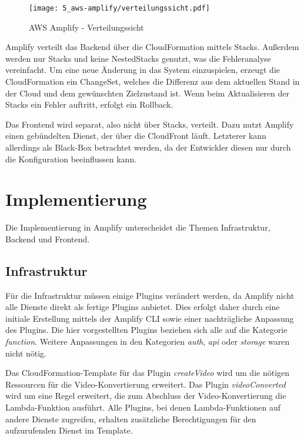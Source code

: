 \begin{figure}
  \centering
  \texttt{[image: 5\_aws-amplify/verteilungssicht.pdf]}
  \caption{AWS Amplify - Verteilungssicht}
  \label{Amplify:verteilungssicht}
\end{figure}

Amplify verteilt das Backend über die CloudFormation mittels Stacks. Außerdem werden nur Stacks und keine NestedStacks genutzt, was die Fehleranalyse vereinfacht. Um eine neue Änderung in das System einzuspielen, erzeugt die CloudFormation ein ChangeSet, welches die Differenz aus dem aktuellen Stand in der Cloud und dem gewünschten Zielzustand ist. Wenn beim Aktualisieren der Stacks ein Fehler auftritt, erfolgt ein Rollback.

Das Frontend wird separat, also nicht über Stacks, verteilt. Dazu nutzt Amplify einen gebündelten Dienst, der über die CloudFront läuft. Letzterer kann allerdings als Black-Box betrachtet werden, da der Entwickler diesen nur durch die Konfiguration beeinflussen kann.

\section{Implementierung}

Die Implementierung in Amplify unterscheidet die Themen Infrastruktur, Backend und Frontend.

\subsection{Infrastruktur}

Für die Infrastruktur müssen einige Plugins verändert werden, da Amplify nicht alle Dienste direkt als fertige Plugins anbietet. Dies erfolgt daher durch eine initiale Erstellung mittels der Amplify CLI sowie einer nachträgliche Anpassung des Plugins. Die hier vorgestellten Plugins beziehen sich alle auf die Kategorie \textit{function}. Weitere Anpassungen in den Kategorien \textit{auth}, \textit{api} oder \textit{storage} waren nicht nötig.

Das CloudFormation-Template für das Plugin \textit{createVideo} wird um die nötigen Ressourcen für die Video-Konvertierung erweitert. Das Plugin \textit{videoConverted} wird um eine Regel erweitert, die zum Abschluss der Video-Konvertierung die Lambda-Funktion ausführt. Alle Plugins, bei denen Lambda-Funktionen auf andere Dienste zugreifen, erhalten zusätzliche Berechtigungen für den aufzurufenden Dienst im Template.

